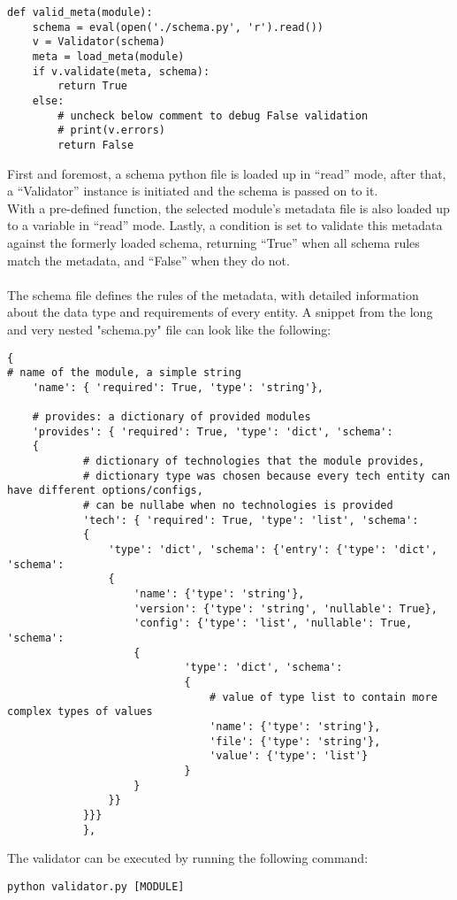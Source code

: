 \begin{lstlisting}[caption=Metadata validation, style=pythonstyle]
def valid_meta(module):
    schema = eval(open('./schema.py', 'r').read())
    v = Validator(schema)
    meta = load_meta(module)
    if v.validate(meta, schema):
        return True
    else:
        # uncheck below comment to debug False validation
        # print(v.errors)
        return False
\end{lstlisting}


First and foremost, a schema python file is loaded up in “read” mode, after that, a “Validator” instance is initiated and the schema is passed on to it.\\
With a pre-defined function, the selected module’s metadata file is also loaded up to a variable in “read” mode. Lastly, a condition is set to validate this metadata against the formerly loaded schema, returning “True” when all schema rules match the metadata, and “False” when they do not.\\
\\
The schema file defines the rules of the metadata, with detailed information about the data type and requirements of every entity. A snippet from the long and very nested "schema.py" file can look like the following:
\\
\begin{lstlisting}[caption=Validation schema, style=pythonstyle]
{
# name of the module, a simple string
    'name': { 'required': True, 'type': 'string'},

    # provides: a dictionary of provided modules
    'provides': { 'required': True, 'type': 'dict', 'schema':
    {
            # dictionary of technologies that the module provides,
            # dictionary type was chosen because every tech entity can have different options/configs,
            # can be nullabe when no technologies is provided
            'tech': { 'required': True, 'type': 'list', 'schema':
            {
                'type': 'dict', 'schema': {'entry': {'type': 'dict', 'schema':
                {
                    'name': {'type': 'string'},
                    'version': {'type': 'string', 'nullable': True},
                    'config': {'type': 'list', 'nullable': True, 'schema':
                    {
                            'type': 'dict', 'schema':
                            {
                                # value of type list to contain more complex types of values
                                'name': {'type': 'string'},
                                'file': {'type': 'string'},
                                'value': {'type': 'list'}
                            }
                    }
                }}
            }}}
            },
\end{lstlisting}
The validator can be executed by running the following command:
\begin{lstlisting}[caption=Validator command, style=pythonstyle]
python validator.py [MODULE]
\end{lstlisting}
\clearpage


